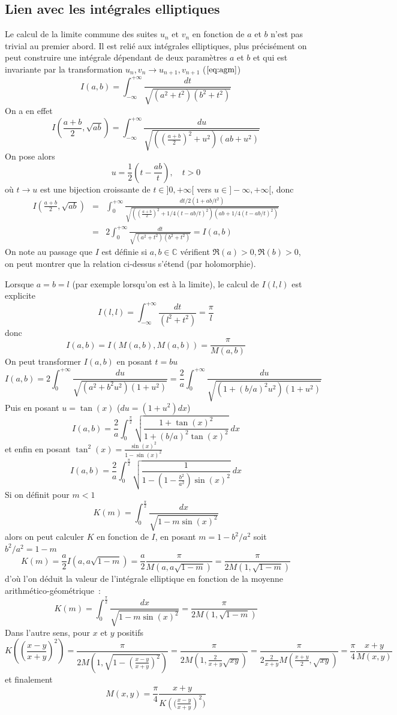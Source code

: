 \documentclass[a4paper,11pt]{article}
\begin{document}
\begin{giacjshere}
\subsection{Lien avec les int\'egrales elliptiques}
Le calcul de la limite commune des suites $u_n$ et $v_n$ en fonction
de $a$ et $b$ n'est pas trivial
au premier abord. Il est reli\'e aux int\'egrales elliptiques, plus
pr\'ecis\'ement on peut construire une int\'egrale d\'ependant
de deux param\`etres $a$ et $b$ et qui est invariante par
la transformation $u_n,v_n \rightarrow u_{n+1},v_{n+1}$ (\(\ref{eq:agm}\))
\[ I(a,b)=\int_{-\infty}^{+\infty}  \frac{dt} {\sqrt{(a^2+t^2)(b^2+t^2)}}
\]
On a en effet
\[ I(\frac{a+b}{2},\sqrt{ab})
= \int_{-\infty}^{+\infty}  \frac{du}{\sqrt{((\frac{a+b}{2})^2+u^2)(ab+u^2)}} \]
On pose alors 
\[ u=\frac{1}{2} (t-\frac{ab}{t}), \quad t>0 \]
o\`u $t \rightarrow u$ est une bijection croissante de $t\in]0,+\infty[$ vers 
$u \in ]-\infty,+\infty[$, donc
\begin{eqnarray*}
I(\frac{a+b}{2},\sqrt{ab})
&=& \int_{0}^{+\infty}  \frac{dt/2(1+ab/t^2)}{\sqrt{((\frac{a+b}{2})^2+1/4(t-ab/t)^2)(ab+1/4(t-ab/t)^2)}}\\
&=& 2 \int_{0}^{+\infty} \frac{dt}{\sqrt{(a^2+t^2)(b^2+t^2)}}
= I(a,b)
\end{eqnarray*}
On note au passage que $I$ est définie si $a,b \in \mathbb{C}$ vérifient $\Re(a)>0, \Re(b)>0$,
on peut montrer que la relation ci-dessus s'étend (par holomorphie).

Lorsque $a=b=l$ (par exemple lorsqu'on est \`a la limite), 
le calcul de $I(l,l)$ est explicite
\[ I(l,l)=\int_{-\infty}^{+\infty}  \frac{dt}{(l^2+t^2)} = \frac{\pi}{l}\]
donc
\[ I(a,b)=I(M(a,b),M(a,b))=\frac{\pi}{M(a,b)}\]
On peut transformer $I(a,b)$ en posant $t=bu$
\[ I(a,b)=2\int_{0}^{+\infty}  \frac{du}{\sqrt{(a^2+b^2u^2)(1+u^2)}}
= \frac{2}{a} \int_{0}^{+\infty}  \frac{du}{\sqrt{(1+(b/a)^2u^2)(1+u^2)}} \]
Puis en posant $u=\tan(x)$ ($du=(1+u^2) dx$)
\[ I(a,b)=\frac{2}{a} \int_0^{\frac{\pi}{2}} 
\sqrt{\frac{1+\tan(x)^2}{1+(b/a)^2\tan(x)^2}} \ dx \]
et enfin en posant $\tan^2(x)=\frac{\sin(x)^2}{1-\sin(x)^2}$
\[ I(a,b)= \frac{2}{a} \int_0^{\frac{\pi}{2}}  
\sqrt{ \frac{1}{1-(1-\frac{b^2}{a^2})\sin(x)^2} } \ dx\]
Si on d\'efinit pour $m<1$
\[ K(m)=\int_0^{\frac{\pi}{2}} \frac{dx}{\sqrt{1-m \sin(x)^2}} \]
alors on peut calculer $K$ en fonction de $I$, en posant
$m=1-b^2/a^2$ soit $b^2/a^2=1-m$
\[ K(m)=\frac{a}{2} I(a,a\sqrt{1-m})=\frac{a}{2}\frac{\pi}{M(a,a\sqrt{1-m})}
=\frac{\pi}{2M(1,\sqrt{1-m})} 
\]
d'o\`u l'on d\'eduit la valeur de l'int\'egrale elliptique en fonction
de la moyenne arithm\'etico-g\'eom\'etrique~:
\begin{equation} \label{eq:K}
K(m)=\int_0^{\frac{\pi}{2}} \frac{dx}{\sqrt{1-m \sin(x)^2}}= 
\frac{\pi}{2M(1,\sqrt{1-m})} 
\end{equation}
Dans l'autre sens, pour $x$ et $y$ positifs
\[ K( (\frac{x-y}{x+y})^2 )=  \frac{\pi}{2M(1,\sqrt{1-(\frac{x-y}{x+y})^2})}
=  \frac{\pi}{2M(1,\frac{2}{x+y}\sqrt{xy})}
= \frac{\pi}{2 \frac{2}{x+y} M(\frac{x+y}{2},\sqrt{xy}) }
= \frac{\pi}{4} \frac{x+y}{M(x,y)}
\]
et finalement
\[ M(x,y)=\frac{\pi}{4} \frac{x+y}{ K\left( (\frac{x-y}{x+y}\right)^2 )}\]


\end{giacjshere}
\end{document}
